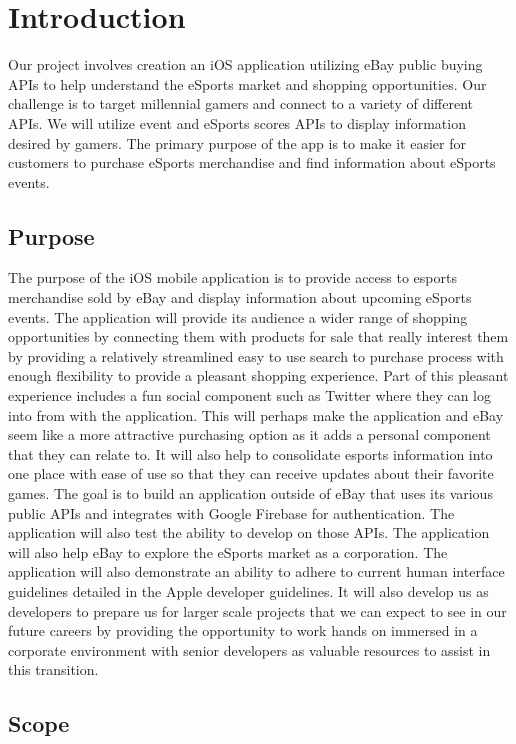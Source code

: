 \documentclass[onecolumn, draftclsnofoot,10pt, compsoc]{IEEEtran}
\begin{document}
\section{Introduction}
Our project involves creation an iOS application utilizing eBay public buying APIs to help understand the eSports market and shopping opportunities. 
Our challenge is to target millennial gamers and connect to a variety of different APIs. 
We will utilize event and eSports scores APIs to display information desired by gamers. 
The primary purpose of the app is to make it easier for customers to purchase eSports merchandise and find information about eSports events. 

\subsection{Purpose}
The purpose of the iOS mobile application is to provide access to esports merchandise sold by eBay and display information about upcoming eSports events. The application will provide its audience a wider range of shopping opportunities by connecting them with products for sale that really interest them by providing a relatively streamlined easy to use search to purchase process with enough flexibility to provide a pleasant shopping experience.  Part of this pleasant experience includes a fun social component such as Twitter where they can log into from with the application. This will perhaps make the application and eBay seem like a more attractive purchasing option as it adds a personal component that they can relate to. It will also help to consolidate esports information into one place with ease of use so that they can receive updates about their favorite games. The goal is to build an application outside of eBay that uses its various public APIs and integrates with Google Firebase for authentication. The application will also test the ability to develop on those APIs. The application will also help eBay to explore the eSports market as a corporation. The application will also demonstrate an ability to adhere to current human interface guidelines detailed in the Apple developer guidelines. It will also develop us as developers to prepare us for larger scale projects that we can expect to see in our future careers by providing the opportunity to work hands on immersed in a corporate environment with senior developers as valuable resources to assist in this transition.
\subsection{Scope}
\end{document}
